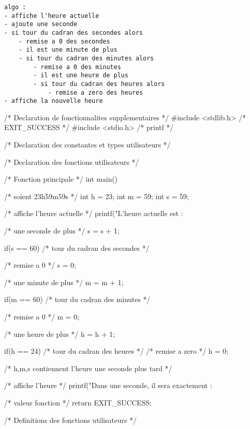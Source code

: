 \begin{correction}
\begin{verbatim}
algo :
- affiche l'heure actuelle
- ajoute une seconde
- si tour du cadran des secondes alors
    - remise a 0 des secondes
    - il est une minute de plus
    - si tour du cadran des minutes alors
        - remise a 0 des minutes
        - il est une heure de plus
        - si tour du cadran des heures alors
    	    - remise a zero des heures
- affiche la nouvelle heure
\end{verbatim}
  \begin{listing}{1}
/* Declaration de fonctionnalites supplementaires */
#include <stdlib.h> /* EXIT_SUCCESS */
#include <stdio.h> /* printf */

/* Declaration des constantes et types utilisateurs */

/* Declaration des fonctions utilisateurs */

/* Fonction principale */
int main()
{
    /* soient 23h59m59s */
    int h = 23;
    int m = 59;
    int s = 59;

    /* affiche l'heure actuelle */
    printf("L'heure actuelle est : %

    /* une seconde de plus */
    s = s + 1;

    if(s == 60) /* tour du cadran des secondes */
    {
	/* remise a 0 */
	s = 0;

	/* une minute de plus */
	m = m + 1;

	if(m == 60) /* tour du cadran des minutes */
	{
	    /* remise a 0 */
	    m = 0;

	    /* une heure de plus */
	    h = h + 1;

	    if(h == 24) /* tour du cadran des heures */
	    {
		/* remise a zero */
		h = 0;
	    }
	}
    }
    /* h,m,s contiennent l'heure une seconde plus tard */

    /* affiche l'heure */
    printf("Dans une seconde, il sera exactement : %

    /* valeur fonction */
    return EXIT_SUCCESS;
}

/* Definitions des fonctions utilisateurs */
  \end{listing}
\end{correction}


